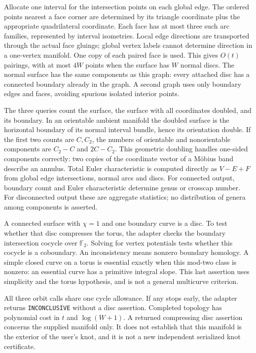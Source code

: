 Allocate one interval for the intersection points on each global edge.
The ordered points nearest a face corner are determined by its triangle
coordinate plus the appropriate quadrilateral coordinate. Each face has
at most three such arc families, represented by interval isometries.
Local edge directions are transported through the actual face gluings;
global vertex labels cannot determine direction in a one-vertex manifold.
One copy of each paired face is used. This gives $O(t)$ pairings, with
at most $4W$ points when the surface has $W$ normal discs. The normal
surface has the same components as this graph: every attached disc has a
connected boundary already in the graph. A second graph uses only boundary
edges and faces, avoiding spurious isolated interior points.

The three queries count the surface, the surface with all coordinates
doubled, and its boundary. In an orientable ambient manifold the doubled
surface is the horizontal boundary of its normal interval bundle, hence
its orientation double. If the first two counts are $C,C_2$, the numbers
of orientable and nonorientable components are $C_2-C$ and $2C-C_2$.
This geometric doubling handles one-sided components correctly: two copies
of the coordinate vector of a M\"obius band describe an annulus.
Total Euler characteristic is computed directly as $V-E+F$ from global
edge intersections, normal arcs and discs. For connected output, boundary
count and Euler characteristic determine genus or crosscap number.
For disconnected output these are aggregate statistics; no distribution
of genera among components is asserted.

A connected surface with $\chi=1$ and one boundary curve is a disc.
To test whether that disc compresses the torus, the adapter checks the
boundary intersection cocycle over $\mathbb F_2$. Solving for vertex
potentials tests whether this cocycle is a coboundary. An inconsistency
means nonzero boundary homology. A simple closed curve on a torus is
essential exactly when this mod-two class is nonzero: an essential curve
has a primitive integral slope. This last assertion uses simplicity and
the torus hypothesis, and is not a general multicurve criterion.

All three orbit calls share one cycle allowance. If any stops early, the
adapter returns \texttt{INCONCLUSIVE} without a disc assertion. Completed
topology has polynomial cost in $t$ and $\log(W+1)$. A returned compressing
disc assertion concerns the supplied manifold only. It does not establish
that this manifold is the exterior of the user's knot, and it is not a
new independent serialized knot certificate.

